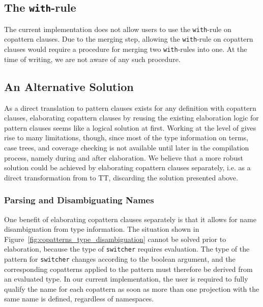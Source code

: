 \subsection{The \texttt{with}-rule}
The current implementation does not allow users to use the \texttt{with}-rule on
copattern clauses. Due to the merging step, allowing the \texttt{with}-rule on
copattern clauses would require a procedure for merging two
\texttt{with}-rules into one. At the time of writing, we are not aware of any
such procedure.

\subsection{An Alternative Solution}
As a direct translation to pattern clauses exists for any definition with
copattern clauses, elaborating copattern clauses by reusing the existing
elaboration logic for pattern clauses seems like a logical solution at
first. Working at the level of \IdrisM{} gives rise to many limitations, though,
since most of the type information on terms, case trees, and coverage checking
is not available until later in the compilation process, namely during and after
elaboration. We believe that a more robust solution could be achieved by
elaborating copattern clauses separately, i.e. as a direct transformation from
\IdrisM{} to TT, discarding the solution presented
above.

\subsubsection{Parsing and Disambiguating Names}
One benefit of elaborating copattern clauses separately is that it
allows for name disambiguation from type information. The situation shown in
Figure~\ref{fig:copatterns_type_disambiguation} cannot be solved prior to
elaboration, because the type of \texttt{switcher} requires evaluation. The type
of the pattern for \texttt{switcher} changes according to the boolean argument,
and the corresponding copatterns applied to the pattern must therefore be
derived from an evaluated type. In our current implementation, the user is required to fully
qualify the name for each copattern as soon as more than one projection with the
same name is defined, regardless of namespaces.

